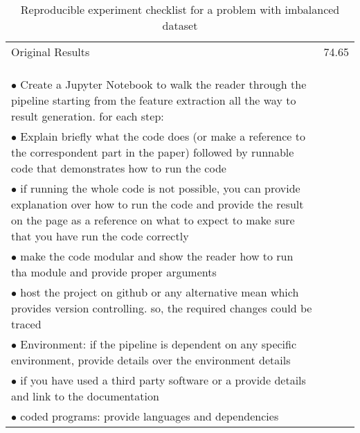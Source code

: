 \begin{table}[ht]
    \centering
    \begin{tabular}{| P{12cm} || p{4cm} |}
        \hline
         \\
        \hline \hline
        Original Results & 74.65 \\
        \hline \hline
        \\
        \hline \hline
        \\
        \hline \hline
        \\
        \hline \hline
        
        $\bullet$
        {Create a Jupyter Notebook to walk the reader through the pipeline starting from the feature extraction 
        all the way to result generation. for each step:}&\\ 
        \quad $\bullet$ 
        {Explain briefly what the code does (or make a reference to the correspondent part in the paper) 
        followed by runnable code that demonstrates how to run the code}&\\ 
        \quad $\bullet$ 
        {if running the whole code is not possible, you can provide explanation over how to run the code and provide the result
        on the page as a reference on what to expect to make sure that you have run the code correctly}&\\ 
        \quad $\bullet$ 
        {make the code modular and show the reader how to run tha module and provide proper arguments }&\\ 
        $\bullet$ 
        {host the project on github or any alternative mean which provides version controlling. so, the required changes could be traced}&\\ 
        $\bullet$ 
        {Environment: if the pipeline is dependent on any specific environment, provide details over the environment details}&\\ 
        $\bullet$ 
        {if you have used a third party software or a provide details and link to the documentation}&\\ 
        $\bullet$ 
        {coded programs: provide languages and dependencies}&\\ 

        \hline

    \end{tabular}
    \captionsetup{font=small,width=12cm}
    \caption{Reproducible experiment checklist for a problem with imbalanced dataset}
    \label{tab:table3}
    
\end{table}